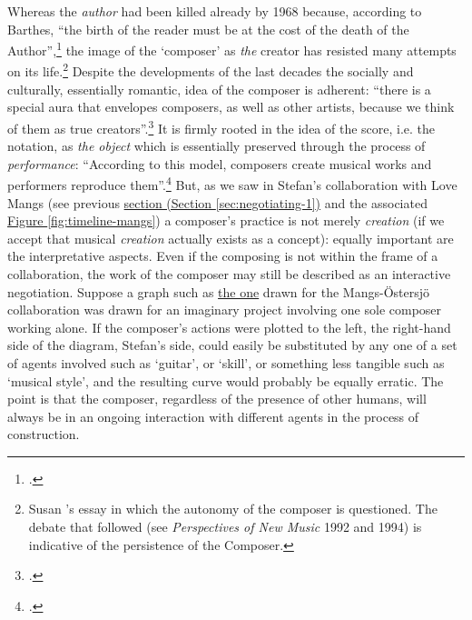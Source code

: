 Whereas the \emph{author} had been killed already by 1968 because, according to Barthes, ``the birth of the reader must be at the cost of the death of the Author'',\footcite[148]{barthes68} the image of the `composer' as \emph{the} creator has resisted many attempts on its life.\footnote{Susan \citeauthor{mcclary89}'s essay  in which the autonomy of the composer is questioned. The debate that followed (see \emph{Perspectives of New Music} 1992 and 1994) is indicative of the persistence of the Composer.\nocite{mcclary89}} Despite the developments of the last decades the socially and culturally, essentially romantic, idea of the composer is adherent: ``there is a special aura that envelopes composers, as well as other artists, because we think of them as true creators''.\footcite[Jerrold Levinson, \emph{What a Musical Work is} quoted in][37]{benson03} It is firmly rooted in the idea of the score, i.e. the notation, as \emph{the object} which is essentially preserved through the process of \emph{performance}: ``According to this model, composers create musical works and performers reproduce them''.\footcite[9]{benson03} But, as we saw in Stefan's collaboration with Love Mangs (see previous \hyperref[sec:negotiating-1]{section (Section \ref*{sec:negotiating-1})} and the associated \hyperref[fig:timeline-mangs]{Figure \ref*{fig:timeline-mangs}}) a composer's practice is not merely \emph{creation} (if we accept that musical \emph{creation} actually exists as a concept): equally important are the interpretative aspects. Even if the composing is not within the frame of a collaboration, the work of the composer may still be described as an interactive negotiation. Suppose a graph such as \hyperref[fig:timeline-mangs]{the one} drawn for the  Mangs-{\"O}stersj{\"o} collaboration was drawn for an imaginary project involving one sole composer working alone. If the composer's actions were plotted to the left, the right-hand side of the diagram, Stefan's side,  could easily be substituted by any one of a set of agents involved such as `guitar', or `skill', or something less tangible such as `musical style', and the resulting curve would probably be equally erratic. The point is that the composer, regardless of the presence of other humans, will always be in an ongoing interaction with different agents in the process of construction. 


